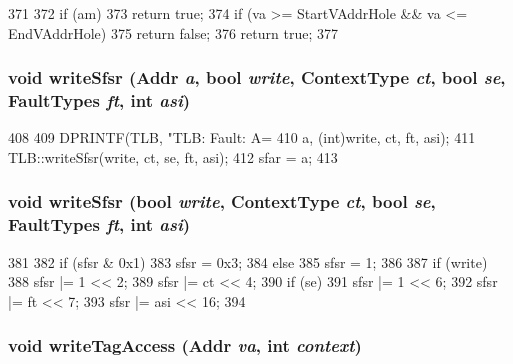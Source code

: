 \begin{DoxyCode}
371 {
372     if (am)
373         return true;
374     if (va >= StartVAddrHole && va <= EndVAddrHole)
375         return false;
376     return true;
377 }
\end{DoxyCode}
\hypertarget{classSparcISA_1_1TLB_a3c55ffc205560c3c945248eda4e0a62d}{
\subsubsection[{writeSfsr}]{\setlength{\rightskip}{0pt plus 5cm}void writeSfsr ({\bf Addr} {\em a}, \/  bool {\em write}, \/  {\bf ContextType} {\em ct}, \/  bool {\em se}, \/  {\bf FaultTypes} {\em ft}, \/  int {\em asi})}}
\label{classSparcISA_1_1TLB_a3c55ffc205560c3c945248eda4e0a62d}



\begin{DoxyCode}
408 {
409     DPRINTF(TLB, "TLB: Fault: A=%
410             a, (int)write, ct, ft, asi);
411     TLB::writeSfsr(write, ct, se, ft, asi);
412     sfar = a;
413 }
\end{DoxyCode}
\hypertarget{classSparcISA_1_1TLB_afd0c300a55c5f8ae2a678bcac2179afb}{
\subsubsection[{writeSfsr}]{\setlength{\rightskip}{0pt plus 5cm}void writeSfsr (bool {\em write}, \/  {\bf ContextType} {\em ct}, \/  bool {\em se}, \/  {\bf FaultTypes} {\em ft}, \/  int {\em asi})}}
\label{classSparcISA_1_1TLB_afd0c300a55c5f8ae2a678bcac2179afb}



\begin{DoxyCode}
381 {
382     if (sfsr & 0x1)
383         sfsr = 0x3;
384     else
385         sfsr = 1;
386 
387     if (write)
388         sfsr |= 1 << 2;
389     sfsr |= ct << 4;
390     if (se)
391         sfsr |= 1 << 6;
392     sfsr |= ft << 7;
393     sfsr |= asi << 16;
394 }
\end{DoxyCode}
\hypertarget{classSparcISA_1_1TLB_a7f076e15ef97f1dd3f5e128b48cb4974}{
\subsubsection[{writeTagAccess}]{\setlength{\rightskip}{0pt plus 5cm}void writeTagAccess ({\bf Addr} {\em va}, \/  int {\em context})}}
\label{classSparcISA_1_1TLB_a7f076e15ef97f1dd3f5e128b48cb4974}



